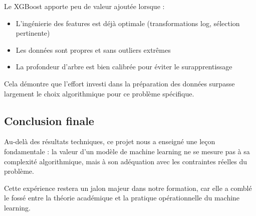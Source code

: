 \documentclass[11pt]{article}
\providecommand{\tightlist}{%
      \setlength{\itemsep}{0pt}\setlength{\parskip}{0pt}}
\begin{document}
Le XGBoost apporte peu de valeur ajoutée lorsque :

\begin{itemize}
  \tightlist
  \item
        L'ingénierie des features est déjà optimale (transformations log,
        sélection pertinente)
  \item
        Les données sont propres et sans outliers extrêmes
  \item
        La profondeur d'arbre est bien calibrée pour éviter le
        surapprentissage
\end{itemize}

Cela démontre que l'effort investi dans la préparation des données
surpasse largement le choix algorithmique pour ce problème spécifique.

\subsection{Conclusion finale}\label{conclusion-finale}

Au-delà des résultats techniques, ce projet nous a enseigné une leçon
fondamentale : la valeur d'un modèle de machine learning ne se mesure
pas à sa complexité algorithmique, mais à son adéquation avec les
contraintes réelles du problème.

Cette expérience restera un jalon majeur dans notre formation, car elle
a comblé le fossé entre la théorie académique et la pratique
opérationnelle du machine learning.


\end{document}
